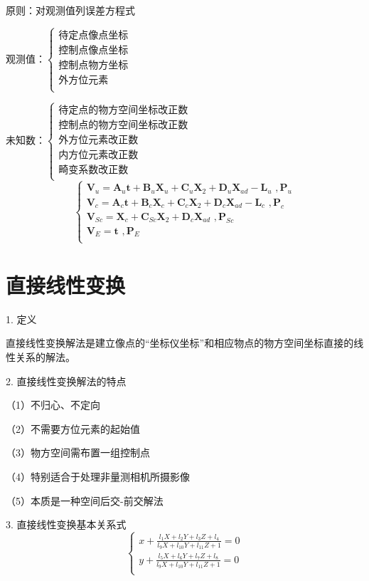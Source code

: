 \documentclass[a4paper]{ctexart}
\begin{document}
原则：对观测值列误差方程式

观测值：$\begin{cases}
	\text{待定点像点坐标}\\
	\text{控制点像点坐标}\\
	\text{控制点物方坐标}\\
	\text{外方位元素}\\
\end{cases}$

未知数：$\begin{cases}	
	\text{待定点的物方空间坐标改正数}\\
	\text{控制点的物方空间坐标改正数}\\
	\text{外方位元素改正数}\\
	\text{内方位元素改正数}\\
	\text{畸变系数改正数}\\
\end{cases}$
$$
\begin{cases}
	\boldsymbol{V}_u=\boldsymbol{A}_u\boldsymbol{t}+\boldsymbol{B}_u\boldsymbol{X}_u+\boldsymbol{C}_u\boldsymbol{X}_2+\boldsymbol{D}_u\boldsymbol{X}_{ad}-\boldsymbol{L}_u\,\,,\boldsymbol{P}_u\\
	\boldsymbol{V}_c=\boldsymbol{A}_c\boldsymbol{t}+\boldsymbol{B}_c\boldsymbol{X}_c+\boldsymbol{C}_c\boldsymbol{X}_2+\boldsymbol{D}_c\boldsymbol{X}_{ad}-\boldsymbol{L}_c\,\,,\boldsymbol{P}_c\\
	\boldsymbol{V}_{Sc}=\boldsymbol{X}_c+\boldsymbol{C}_{Sc}\boldsymbol{X}_2+\boldsymbol{D}_c\boldsymbol{X}_{ad}\,\,,\boldsymbol{P}_{Sc}\\
	\boldsymbol{V}_E=\boldsymbol{t}\,\,,\boldsymbol{P}_E\\
\end{cases}
$$
\newpage
\section{直接线性变换}
1. 定义

直接线性变换解法是建立像点的“坐标仪坐标”和相应物点的物方空间坐标直接的线性关系的解法。

2. 直接线性变换解法的特点

（1）不归心、不定向

（2）不需要方位元素的起始值

（3）物方空间需布置一组控制点

（4）特别适合于处理非量测相机所摄影像

（5）本质是一种空间后交-前交解法

3. 直接线性变换基本关系式
$$
\begin{cases}
	x+\frac{l_1X+l_2Y+l_3Z+l_4}{l_9X+l_{10}Y+l_{11}Z+1}=0\\
	y+\frac{l_5X+l_6Y+l_7Z+l_8}{l_9X+l_{10}Y+l_{11}Z+1}=0\\
\end{cases}
$$
\end{document}
